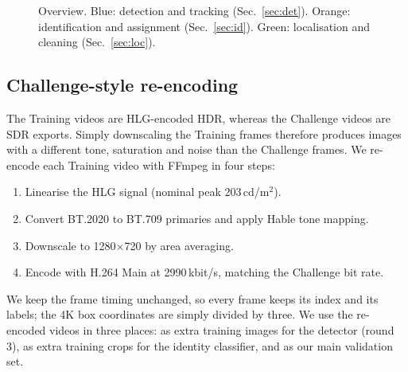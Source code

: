 \documentclass[11pt,a4paper]{article}
\begin{document}
\begin{figure}[t]
\centering
{}
\caption{Overview. Blue: detection and tracking (Sec.~\ref{sec:det}). Orange: identification and
assignment (Sec.~\ref{sec:id}). Green: localisation and cleaning (Sec.~\ref{sec:loc}).}
\label{fig:pipeline}
\end{figure}

\subsection{Challenge-style re-encoding}
\label{sec:enc}
The Training videos are HLG-encoded HDR, whereas the Challenge videos are SDR exports. Simply
downscaling the Training frames therefore produces images with a different tone, saturation and noise
than the Challenge frames. We re-encode each Training video with FFmpeg in four steps:
\begin{enumerate}
\item Linearise the HLG signal (nominal peak 203\,cd/m$^2$).
\item Convert BT.2020 to BT.709 primaries and apply Hable tone mapping.
\item Downscale to 1280$\times$720 by area averaging.
\item Encode with H.264 Main at 2990\,kbit/s, matching the Challenge bit rate.
\end{enumerate}
We keep the frame timing unchanged, so every frame keeps its index and its labels; the 4K box
coordinates are simply divided by three. We use the re-encoded videos in three places: as extra
training images for the detector (round 3), as extra training crops for the identity classifier, and
as our main validation set.
\end{document}
